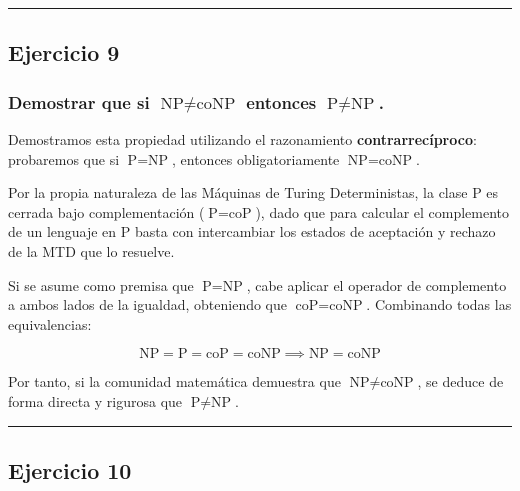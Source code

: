 \documentclass[12pt]{book} %
\begin{document}
\begin{center}\rule{0.5\linewidth}{0.5pt}\end{center}

\hypertarget{ejercicio-9}{%
\subsection{Ejercicio 9}\label{ejercicio-9}}

\hypertarget{demostrar-que-si-textnp-neq-textconp-entonces-textp-neq-textnp.}{%
\subsubsection{\texorpdfstring{Demostrar que si
\(\text{NP} \neq \text{coNP}\) entonces
\(\text{P} \neq \text{NP}\).}{Demostrar que si \textbackslash text\{NP\} \textbackslash neq \textbackslash text\{coNP\} entonces \textbackslash text\{P\} \textbackslash neq \textbackslash text\{NP\}.}}\label{demostrar-que-si-textnp-neq-textconp-entonces-textp-neq-textnp.}}

Demostramos esta propiedad utilizando el razonamiento
\textbf{contrarrecíproco}: probaremos que si \(\text{P} = \text{NP}\),
entonces obligatoriamente \(\text{NP} = \text{coNP}\).

Por la propia naturaleza de las Máquinas de Turing Deterministas, la
clase \(\text{P}\) es cerrada bajo complementación
(\(\text{P} = \text{coP}\)), dado que para calcular el complemento de un
lenguaje en \(\text{P}\) basta con intercambiar los estados de
aceptación y rechazo de la MTD que lo resuelve.

Si se asume como premisa que \(\text{P} = \text{NP}\), cabe aplicar el
operador de complemento a ambos lados de la igualdad, obteniendo que
\(\text{coP} = \text{coNP}\). Combinando todas las equivalencias:

\[\text{NP} = \text{P} = \text{coP} = \text{coNP} \implies \text{NP} = \text{coNP}\]

Por tanto, si la comunidad matemática demuestra que
\(\text{NP} \neq \text{coNP}\), se deduce de forma directa y rigurosa
que \(\text{P} \neq \text{NP}\).

\begin{center}\rule{0.5\linewidth}{0.5pt}\end{center}

\hypertarget{ejercicio-10}{%
\subsection{Ejercicio 10}\label{ejercicio-10}}
\end{document}
